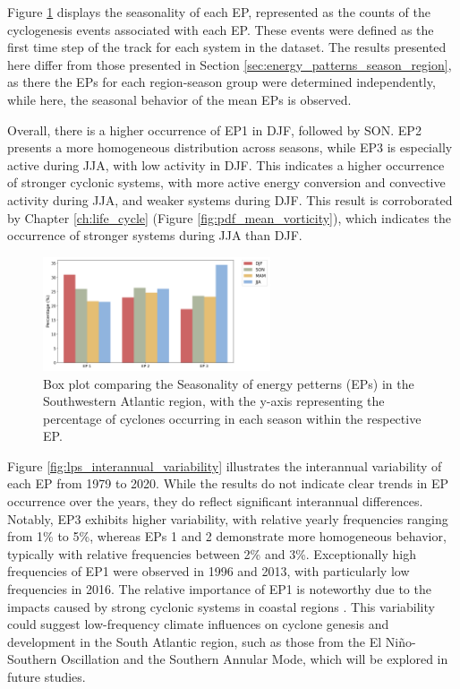Figure \ref{fig:lps_seasonality} displays the seasonality of each EP, represented as the counts of the cyclogenesis events associated with each EP. These events were defined as the first time step of the track for each system in the dataset. The results presented here differ from those presented in Section \ref{sec:energy_patterns_season_region}, as there the EPs for each region-season group were determined independently, while here, the seasonal behavior of the mean EPs is observed. 

Overall, there is a higher occurrence of EP1 in DJF, followed by SON. EP2 presents a more homogeneous distribution across seasons, while EP3 is especially active during JJA, with low activity in DJF. This indicates a higher occurrence of stronger cyclonic systems, with more active energy conversion and convective activity during JJA, and weaker systems during DJF. This result is corroborated by Chapter \ref{ch:life_cycle} (Figure \ref{fig:pdf_mean_vorticity}), which indicates the occurrence of stronger systems during JJA than DJF.


\begin{figure}[!htbp]
    \centering
    \includegraphics[width=0.6\textwidth]{figs_6/lps_seasonality.png}
    \caption[Energy Patterns - Seasonality]{Box plot comparing the Seasonality of energy petterns (EPs) in the Southwestern Atlantic region, with the y-axis representing the percentage of cyclones occurring in each season within the respective EP.}
    \label{fig:lps_seasonality}
\end{figure}

Figure \ref{fig:lps_interannual_variability} illustrates the interannual variability of each EP from 1979 to 2020. While the results do not indicate clear trends in EP occurrence over the years, they do reflect significant interannual differences. Notably, EP3 exhibits higher variability, with relative yearly frequencies ranging from 1\% to 5\%, whereas EPs 1 and 2 demonstrate more homogeneous behavior, typically with relative frequencies between 2\% and 3\%. Exceptionally high frequencies of EP1 were observed in 1996 and 2013, with particularly low frequencies in 2016. The relative importance of EP1 is noteworthy due to the impacts caused by strong cyclonic systems in coastal regions \citep{de2021ocean,cardoso2022synoptic,leal2023identification}. This variability could suggest low-frequency climate influences on cyclone genesis and development in the South Atlantic region, such as those from the El Niño-Southern Oscillation and the Southern Annular Mode, which will be explored in future studies.


